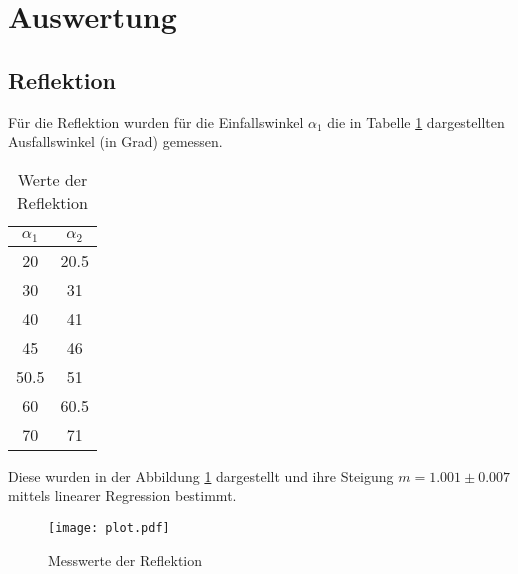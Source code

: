 \section{Auswertung}
\label{sec:Auswertung}

\subsection{Reflektion}
  Für die Reflektion wurden für die Einfallswinkel $\alpha_1$ die in Tabelle \ref{tab:angle} dargestellten Ausfallswinkel (in Grad)
  gemessen.
  \begin{table}[H]
    \centering
    \caption{Werte der Reflektion}
    \begin{tabular}{c c}
      \toprule
      $\alpha_1$ & $\alpha_2$\\
      \midrule
        20 & 20.5 \\
        30 & 31   \\
        40 & 41   \\
        45 & 46   \\
        50.5 & 51 \\
        60 & 60.5 \\
        70 & 71   \\
      \bottomrule
    \end{tabular}
    \label{tab:angle}
  \end{table}
  \noindent Diese wurden in der Abbildung \ref{fig:plot2} dargestellt und ihre Steigung $m=1.001 \pm 0.007$
  mittels linearer Regression bestimmt.
  \begin{figure}[H]
    \centering
    \texttt{[image: plot.pdf]}
    \caption{Messwerte der Reflektion}
    \label{fig:plot2}
  \end{figure}

